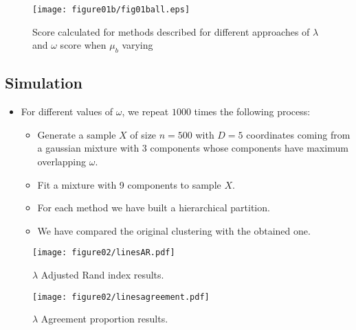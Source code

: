 \documentclass[10pt, a4paper]{article}
\begin{document}
\begin{figure}[!t]
\centering
\texttt{[image: figure01b/fig01ball.eps]}
\caption{Score calculated for methods described for different approaches of $\lambda$ and $\omega$ score when $\mu_b$ varying}
\label{fig:mu_varying3}
\end{figure}


\subsection{Simulation}

\begin{itemize}
\item For different values of $\omega$, we repeat $1000$ times the following process:
\begin{itemize}
\item Generate a sample $X$ of size $n=500$ with $D=5$ coordinates coming from a gaussian mixture with $3$ components whose components have maximum overlapping $\omega$.
\item Fit a mixture with 9 components to sample $X$.
\item For each method we have built a hierarchical partition.
\item We have compared the original clustering with the obtained one. 
\end{itemize}

\end{itemize}

\begin{figure}[!h]
\centering
\texttt{[image: figure02/linesAR.pdf]}
\caption{$\lambda$ Adjusted Rand index results.}
\label{fig:mua}
\end{figure}

\begin{figure}[!h]
\centering
\texttt{[image: figure02/linesagreement.pdf]}
\caption{$\lambda$ Agreement proportion results.}
\label{fig:mub}
\end{figure}



{}
\end{document}
